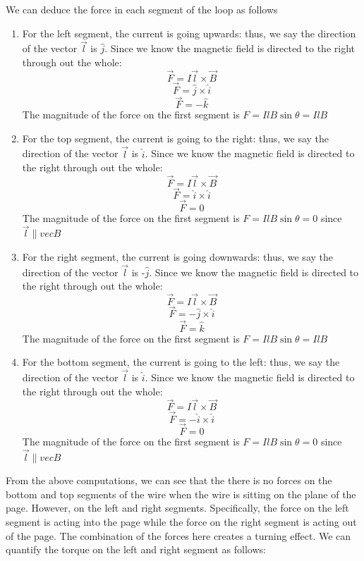 \documentclass[9pt]{article}
\begin{document}
		We can deduce the force in each segment of the loop as follows \begin{enumerate}
			\item For the left segment, the current is going upwards: thus, we say the direction of the vector $\vec{l}$ is $\hat{j}$. Since we know the magnetic field is directed to the right through out the whole:
			$$\vec{F}=I\vec{l}\times\vec{B}$$
			$$\vec{F}=\hat{j}\times\hat{i}$$
			$$\vec{F}=-\hat{k}$$
			The magnitude of the force on the first segment is $F=IlB\sin\theta=IlB$ 
			\item For the top segment, the current is going to the right: thus, we say the direction of the vector $\vec{l}$ is $\hat{i}$. Since we know the magnetic field is directed to the right through out the whole:
			$$\vec{F}=I\vec{l}\times\vec{B}$$
			$$\vec{F}=\hat{i}\times\hat{i}$$
			$$\vec{F}=0$$
			The magnitude of the force on the first segment is $F=IlB\sin\theta=0$ since $\vec{l}\parallel vec{B}$
			\item For the right segment, the current is going downwards: thus, we say the direction of the vector $\vec{l}$ is -$\hat{j}$. Since we know the magnetic field is directed to the right through out the whole:
			$$\vec{F}=I\vec{l}\times\vec{B}$$
			$$\vec{F}=-\hat{j}\times\hat{i}$$
			$$\vec{F}=\hat{k}$$
			The magnitude of the force on the first segment is $F=IlB\sin\theta=IlB$ 
			\item For the bottom segment, the current is going to the left: thus, we say the direction of the vector $\vec{l}$ is $\hat{i}$. Since we know the magnetic field is directed to the right through out the whole:
			$$\vec{F}=I\vec{l}\times\vec{B}$$
			$$\vec{F}=-\hat{i}\times\hat{i}$$
			$$\vec{F}=0$$
			The magnitude of the force on the first segment is $F=IlB\sin\theta=0$ since $\vec{l}\parallel vec{B}$
		\end{enumerate}
		From the above computations, we can see that the there is no forces on the bottom and top segments of the wire when the wire is sitting on the plane of the page. However, on the left and right segments. Specifically, the force on the left segment is acting into the page while the force on the right segment is acting out of the page. The combination of the forces here creates a turning effect. We can quantify the torque on the left and right segment as follows:
		
\end{document}
